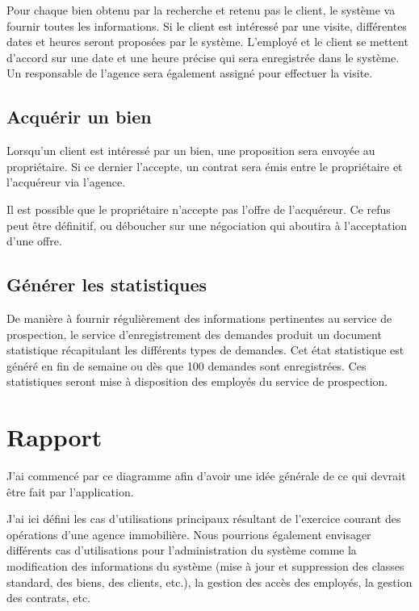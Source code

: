 Pour chaque bien obtenu par la recherche et retenu pas le client, le système va fournir toutes les informations. Si le client est intéressé par une visite, différentes dates et heures seront proposées par le système. L'employé et le client se mettent d'accord sur une date et une heure précise qui sera enregistrée dans le système. Un responsable de l'agence sera également assigné pour effectuer la visite.

\subsection{Acquérir un bien}

Lorsqu'un client est intéressé par un bien, une proposition sera envoyée au propriétaire. Si ce dernier l'accepte, un contrat sera émis entre le propriétaire et l'acquéreur via l'agence.

Il est possible que le propriétaire n'accepte pas l'offre de l'acquéreur. Ce refus peut être définitif, ou déboucher sur une négociation qui aboutira à l'acceptation d'une offre.

\subsection{Générer les statistiques}

De manière à fournir régulièrement des informations pertinentes au service de prospection, le service d'enregistrement des demandes produit un document statistique récapitulant les différents types de demandes. Cet état statistique est généré en fin de semaine ou dès que 100 demandes sont enregistrées. Ces statistiques seront mise à disposition des employés du service de prospection.

\section{Rapport}

J'ai commencé par ce diagramme afin d'avoir une idée générale de ce qui devrait être fait par l'application.

J'ai ici défini les cas d'utilisations principaux résultant de l'exercice courant des opérations d'une agence immobilière. Nous pourrions également envisager différents cas d'utilisations pour l'administration du système comme la modification des informations du système (mise à jour et suppression des classes standard, des biens, des clients, etc.), la gestion des accès des employés, la gestion des contrats, etc.

